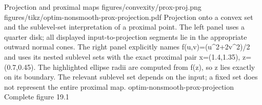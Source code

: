 {Projection and proximal maps}
{figures/convexity/prox-proj.png}
{figures/tikz/optim-nonsmooth-prox-projection.pdf}
{Projection onto a convex set and the sublevel-set interpretation of a proximal point.}
{The left panel uses a quarter disk; all displayed input-to-projection segments lie in the appropriate outward normal cones. The right panel explicitly names f(u,v)=(u\textasciicircum{}2+2v\textasciicircum{}2)/2 and uses its nested sublevel sets with the exact proximal pair x=(1.4,1.35), z=(0.7,0.45). The highlighted ellipse radii are computed from f(z), so z lies exactly on its boundary. The relevant sublevel set depends on the input; a fixed set does not represent the entire proximal map.}
{optim-nonsmooth-prox-projection}
{Complete figure}
{19.1}
